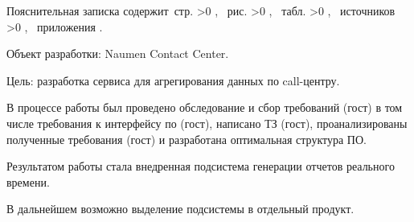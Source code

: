 \Referat

Пояснительная записка содержит \pageref{LastPage}\,стр.%
\ifnum \totfig >0
, \totfig~рис.%
\fi
\ifnum \tottab >0
, \tottab~табл.%
\fi
%
\ifnum \totbib >0
, \totbib~источников%
\fi
%
\ifnum \totapp >0
, \totapp~приложения%
\else
.%
\fi


Объект разработки: Naumen Contact Center.

Цель: разработка сервиса для агрегирования данных по call-центру.

В процессе работы был проведено обследование и сбор требований (гост) в том числе требования к интерфейсу по (гост),
написано ТЗ (гост), проанализированы полученные требования (гост) и разработана оптимальная структура ПО.

Результатом работы стала внедренная подсистема генерации отчетов реального времени.

В дальнейшем возможно выделение подсистемы в отдельный продукт.